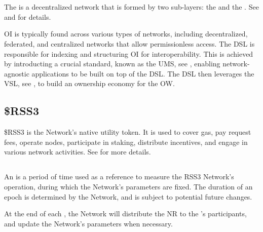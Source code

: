 \section{}

The  is a decentralized network that is formed by two sub-layers: the  and the . See  and  for details.

\gls{OI} is typically found across various types of networks, including decentralized, federated, and centralized networks that allow permissionless access.
The \gls{DSL} is responsible for indexing and structuring \gls{OI} for interoperability.
This is achieved by introducting a crucial standard, known as the \gls{UMS}, see , enabling network-agnostic applications to be built on top of the \gls{DSL}.
The \gls{DSL} then leverages the \gls{VSL}, see , to build an ownership economy for the \gls{OW}.

\subsection{\$RSS3}
\$RSS3 is the Network's native utility token. It is used to cover gas, pay request fees, operate nodes, participate in staking, distribute incentives, and engage in various network activities. See  for more details.

\subsection{}

An  is a period of time used as a reference to measure the RSS3 Network’s operation, during which the Network's parameters are fixed.
The duration of an epoch is determined by the Network, and is subject to potential future changes.

At the end of each \epoch, the Network will distribute the \gls{NR} to the 's participants, and update the Network's parameters when necessary.